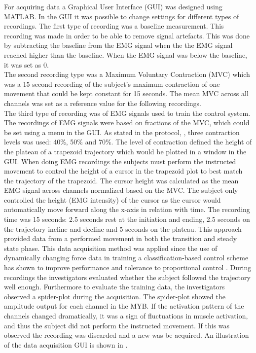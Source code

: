 For acquiring data a Graphical User Interface (GUI) was designed using MATLAB. In the GUI it was possible to change settings for different types of recordings. The first type of recording was a baseline measurement. This recording was made in order to be able to remove signal artefacts. This was done by subtracting the baseline from the EMG signal when the the EMG signal reached higher than the baseline. When the EMG signal was below the baseline, it was set as 0. \\
The second recording type was a Maximum Voluntary Contraction (MVC) which was a 15 second recording of the subject's maximum contraction of one movement that could be kept constant for 15 seconds. The mean MVC across all channels was set as a reference value for the following recordings. \\
The third type of recording was of EMG signals used to train the control system. The recordings of EMG signals were based on fractions of the MVC, which could be set using a menu in the GUI. As stated in the protocol, , three contraction levels was used: 40\%, 50\% and 70\%. The level of contraction defined the height of the plateau of a trapezoid trajectory which would be plotted in a window in the GUI. When doing EMG recordings the subjects must perform the instructed movement to control the height of a cursor in the trapezoid plot to best match the trajectory of the trapezoid. The cursor height was calculated as the mean EMG signal across channels normalized based on the MVC. The subject only controlled the height (EMG intensity) of the cursor as the cursor would automatically move forward along the x-axis in relation with time. The recording time was 15 seconds: 2.5 seconds rest at the initiation and ending, 2.5 seconds on the trajectory incline and decline and 5 seconds on the plateau. This approach provided data from a performed movement in both the transition and steady state phase. This data acquisition method was applied since the use of dynamically changing force data in training a classification-based control scheme has shown to improve performance and tolerance to proportional control \cite{Scheme2015}. 
During recordings the investigators evaluated whether the subject followed the trajectory well enough. Furthermore to evaluate the training data, the investigators observed a spider-plot during the acquisition. The spider-plot showed the amplitude output for each channel in the MYB. If the activation pattern of the channels changed dramatically, it was a sign of fluctuations in muscle activation, and thus the subject did not perform the instructed movement. If this was observed the recording was discarded and a new was be acquired. An illustration of the data acquisition GUI is shown in .

